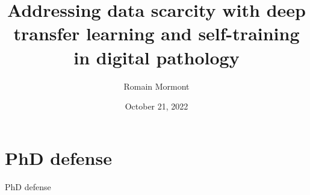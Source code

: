 \documentclass{beamer}
\title{{\bf Addressing data scarcity with deep transfer learning and self-training in digital pathology}}
\author{Romain Mormont}
\institute{Montefiore Institute, University of Liège, Belgium}
\date{October 21, 2022}
\begin{document}
\renewcommand{\inserttotalframenumber}{20}
\section{PhD defense}

\begin{frame}
\titlepage

\begin{center}
PhD defense
\end{center}
\end{frame}

%
\end{document}
